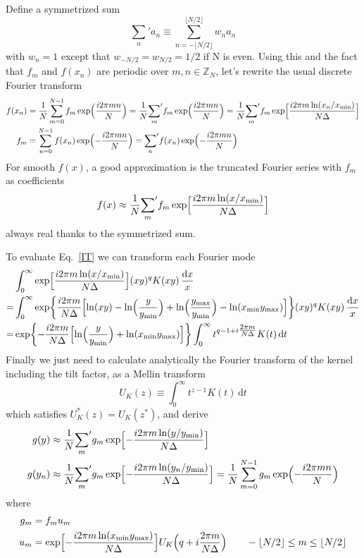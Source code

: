 \documentclass{article}
\renewcommand{\d}{\mathrm{d}}
\newcommand{\xmin}{x_\mathrm{min}}
\newcommand{\ymin}{y_\mathrm{min}}
\newcommand{\ymax}{y_\mathrm{max}}
\newcommand{\Nhalf}{\lfloor N/2\rfloor}
\newcommand{\Mellin}{U}
\begin{document}
Define a symmetrized sum
\begin{equation}
    {\sum_n}' a_n \equiv \sum_{n=-\Nhalf}^{\Nhalf} w_n a_n
\end{equation}
with $w_n=1$ except that $w_{-N/2}=w_{N/2}=1/2$ if N is even.
Using this and the fact that $f_m$ and $f(x_n)$ are periodic over $m,n\in\mathbb{Z}_N$,
let's rewrite the usual discrete Fourier transform
\begin{align}
    f(x_n) &= \frac1N \sum_{m=0}^{N-1} f_m \exp\Bigl(\frac{i2\pi mn}N\Bigr)
    = \frac1N {\sum_m}' f_m \exp\Bigl(\frac{i2\pi mn}N\Bigr)
    = \frac1N {\sum_m}' f_m \exp\Bigl[\frac{i2\pi m\ln(x_n/\xmin)}{N\Delta}\Bigr] \\
    \label{step1}
    f_m &= \sum_{n=0}^{N-1} f(x_n) \exp\Bigl(-\frac{i2\pi mn}N\Bigr)
    = {\sum_n}' f(x_n) \exp\Bigl(-\frac{i2\pi mn}N\Bigr)
\end{align}
For smooth $f(x)$, a good approximation is the truncated Fourier series
with $f_m$ as coefficients
\begin{equation}
    f(x) \approx \frac1N {\sum_m}' f_m \exp\Bigl[\frac{i2\pi m\ln(x/\xmin)}{N\Delta}\Bigr]
\end{equation}
always real thanks to the symmetrized sum.

To evaluate Eq.~\eqref{IT} we can transform each Fourier mode
\begin{align}
    &\int_0^\infty \exp\Bigl[\frac{i2\pi m\ln(x/\xmin)}{N\Delta}\Bigr]
        (xy)^q K(xy) \,\frac{\d x}x \\
    = &\int_0^\infty \exp\biggl\{\frac{i2\pi m}{N\Delta}
        \Bigl[\ln(xy)-\ln\Bigl(\frac{y}{\ymin}\Bigr)
            +\ln\Bigl(\frac{\ymax}{\ymin}\Bigr)-\ln(\xmin\ymax)\Bigr]
    \biggr\} (xy)^q K(xy) \,\frac{\d x}x \\
    = &\exp\biggl\{-\frac{i2\pi m}{N\Delta}
        \Bigl[\ln\Bigl(\frac{y}{\ymin}\Bigr)+\ln(\xmin\ymax)\Bigr]
    \biggr\} \int_0^\infty t^{q-1+i\tfrac{2\pi m}{N\Delta}} K(t) \,\d t
\end{align}
Finally we just need to calculate analytically
the Fourier transform of the kernel including the tilt factor,
as a Mellin transform
\begin{equation}
    \label{Mellin}
    \Mellin_K(z) \equiv \int_0^\infty t^{z-1} K(t) \,\d t
\end{equation}
which satisfies $\Mellin_K^*(z)=\Mellin_K(z^*)$, and derive
\begin{align}
    g(y) &\approx \frac1N {\sum_m}' g_m \exp\Bigl[-\frac{i2\pi m\ln(y/\ymin)}{N\Delta}\Bigr] \\
    \label{step6}
    g(y_n) &\approx \frac1N {\sum_m}' g_m \exp\Bigl[-\frac{i2\pi m\ln(y_n/\ymin)}{N\Delta}\Bigr]
    = \frac1N \sum_{m=0}^{N-1} g_m \exp\Bigl(-\frac{i2\pi mn}N\Bigr)
\end{align}
where
\begin{align}
    \label{step5}
    g_m &= f_m u_m \\
    \label{step4}
    u_m &= \exp\Bigl[-\frac{i2\pi m\ln(\xmin\ymax)}{N\Delta}\Bigr]
    \Mellin_K\Bigl(q+i\frac{2\pi m}{N\Delta}\Bigr) \qquad -\Nhalf\leq m\leq\Nhalf
\end{align}
\end{document}
